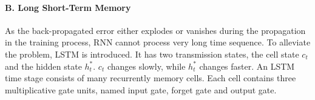 
\paragraph{B. Long Short-Term Memory}
As the back-propagated error  either explodes or vanishes during the propagation in the training process, RNN cannot process very long time sequence.  To alleviate the problem, 
LSTM \cite{song2020time}\cite{sagheer2019time}
is introduced. It has two transmission states, the  cell state $c_t$  and the hidden state $h^*_t$. $c_t$  changes slowly, while $h^*_t$ changes faster. 
An LSTM time stage consists of many recurrently
memory cells. Each cell contains three multiplicative gate units, named input gate, forget gate and output gate.



